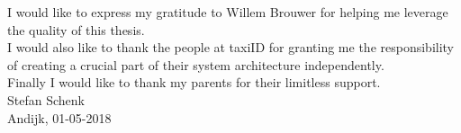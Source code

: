 
\noindent\begin{acknowledgements}

	I would like to express my gratitude to Willem Brouwer for helping me leverage the quality of this thesis. \\

	I would also like to thank the people at taxiID for granting me the responsibility of creating a crucial part of their system architecture independently. \\

	Finally I would like to thank my parents for their limitless support. \\

  Stefan Schenk \\

  Andijk, 01-05-2018 \\

\end{acknowledgements}
